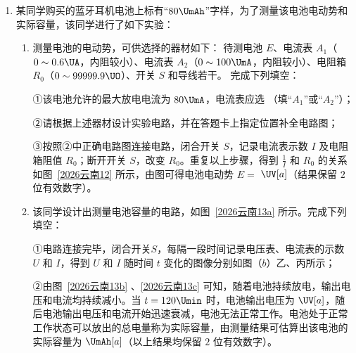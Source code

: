 \documentclass[\gkver]{gaokaozhenti}
\begin{document}
\begin{enumerate}
{\begin{enumerate}
\item
由图可知 $ F_{1} $ 的读数为 $ 6 \times 0.5 \UN=3.0 \UN $

\item
根据平行四边形法则做出合力图像如图所示
由于每小格边长代表 $ 0.5 \UN $，故可得 $ F_{1} $ 和 $ F_{2} $ 的合力大小为 $ F =8 \times 0.5 \UN=4.0 \UN $
\end{enumerate}
}

\item
某同学购买的蓝牙耳机电池上标有“$ 80 \UmAh $”字样，为了测量该电池电动势和实际容量，该同学进行了如下实验：
\begin{enumerate}
	\item 
测量电池的电动势，可供选择的器材如下：
待测电池 $ E $、电流表 $ A _{1} $（$ 0 \sim 0.6 \UA $，内阻较小）、电流表 $ A _{2} $（$ 0 \sim 100 \UmA $，内阻较小）、电阻箱 $ R_{0} $（$ 0 \sim 99999.9 \UO $）、开关 $ S $ 和导线若干。
完成下列填空：

①该电池允许的最大放电电流为 $ 80 \UmA $，电流表应选 （填“$ A _{1} $”或“$ A_{2} $”）；


②请根据上述器材设计实验电路，并在答题卡上指定位置补全电路图；
\onepicture[w=5.27cm, h=3.98cm]{}


③按照②中正确电路图连接电路，闭合开关 $ S $，记录电流表示数 $ I $ 及电阻箱阻值 $ R_{0} $；断开开关 $ S $，改变 $ R_{0} $。重复以上步骤，得到 $ \frac{1}{I} $ 和 $ R_{0} $ 的关系如图~\ref{2026云南12} 所示，由图可得电池电动势 $ E =$  $\UV[a]$（结果保留 $ 2 $ 位有效数字）。
\onepicture[num=12, showlabel=false, label=2026云南12, w=9.23cm, h=6.48cm]{}


\item
该同学设计出测量电池容量的电路，如图~\ref{2026云南13a} 所示。完成下列填空：

①电路连接完毕，闭合开关$ S $，每隔一段时间记录电压表、电流表的示数 $ U $ 和 $ I $，得到 $ U $ 和 $ I $ 随时间 $ t $ 变化的图像分别如图（$ b $）乙、丙所示；
\threepicture[labelA=2026云南13a, labelB=2026云南13b, labelC=2026云南13c, hA=2.99cm, hB=3.52cm, hC=3.52cm]
{}{}{}

②由图~\ref{2026云南13b} 、\ref{2026云南13c} 可知，随着电池持续放电，输出电压和电流均持续减小。当 $ t =120 \Umin $ 时，电池输出电压为  $\UV[a]$，随后电池输出电压和电流开始迅速衰减，电池无法正常工作。电池处于正常工作状态可以放出的总电量称为实际容量，由测量结果可估算出该电池的实际容量为  $\UmAh[a]$（以上结果均保留 $ 2 $ 位有效数字）。	
\end{enumerate}




\end{enumerate}
\end{document}
